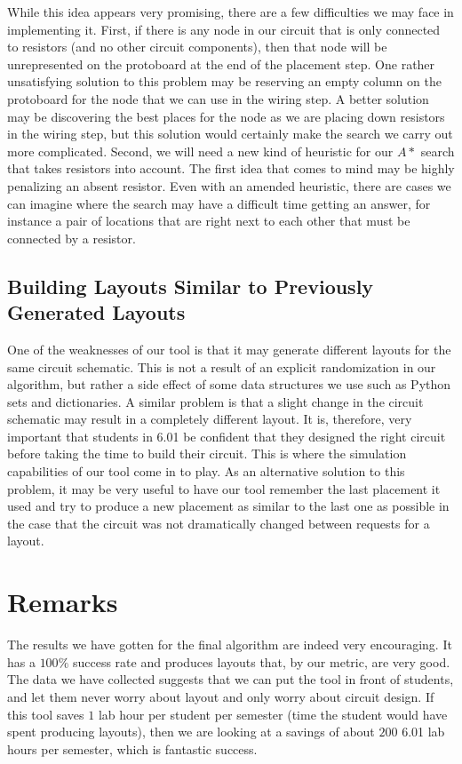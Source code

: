 While this idea appears very promising, there are a few difficulties we may face
in implementing it. First, if there is any node in our circuit that is only
connected to resistors (and no other circuit components), then that node will be
unrepresented on the protoboard at the end of the placement step. One rather
unsatisfying solution to this problem may be reserving an empty column on the
protoboard for the node that we can use in the wiring step. A better solution may
be discovering the best places for the node as we are placing down resistors in
the wiring step, but this solution would certainly make the search we carry out
more complicated. Second, we will need a new kind of heuristic for our $A*$
search that takes resistors into account. The first idea that comes to mind may
be highly penalizing an absent resistor. Even with an amended heuristic, there
are cases we can imagine where the search may have a difficult time getting an
answer, for instance a pair of locations that are right next to each other that
must be connected by a resistor.

\subsection{Building Layouts Similar to Previously Generated Layouts}

One of the weaknesses of our tool is that it may generate different layouts for
the same circuit schematic. This is not a result of an explicit randomization
in our algorithm, but rather a side effect of some data structures we use such
as Python sets and dictionaries. A similar problem is that a slight change in
the circuit schematic may result in a completely different layout. It is,
therefore, very important that students in 6.01 be confident that they designed
the right circuit before taking the time to build their circuit.
This is where the simulation
capabilities of our tool come in to play. As an alternative solution to this
problem, it may be very useful to have our
tool remember the last placement it used and try to produce a new placement as
similar to the last one as possible in the case that the circuit was not
dramatically changed between requests for a layout.

\section{Remarks}

The results we have gotten for the final algorithm are indeed very encouraging.
It has a $100\%$ success rate and produces layouts that, by our metric, are very
good. The data we have collected suggests that we can put the tool in front of
students, and let them never worry about layout and only worry about circuit
design. If this tool saves $1$ lab hour per student per semester (time the
student would have spent producing layouts), then we are
looking at a savings of about $200$ 6.01 lab hours per semester, which is
fantastic success.
